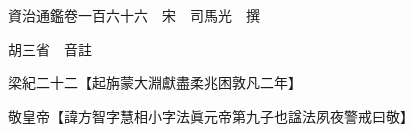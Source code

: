 










 


 
 


 

  
  
  
  
  





  
  
  
  
  
 
  

  

  
  
  



  

 
 

  
   




  

  
  


  　　資治通鑑卷一百六十六　宋　司馬光　撰

　　胡三省　音註

　　梁紀二十二【起旃蒙大淵獻盡柔兆困敦凡二年】

　　敬皇帝【諱方智字慧相小字法眞元帝第九子也諡法夙夜警戒曰敬】

